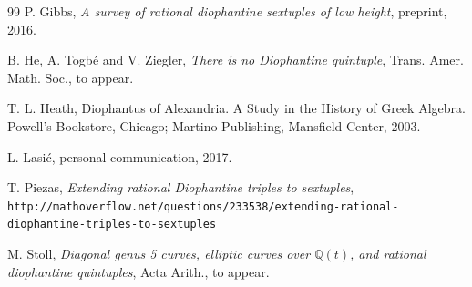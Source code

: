 \documentclass[a4paper]{amsart}
\theoremstyle{plain}
\theoremstyle{definition}
\begin{document}
\begin{thebibliography}{99}
P. Gibbs,
{\it A survey of rational diophantine sextuples of low height}, preprint, 2016.

B. He, A. Togb\'e and V. Ziegler,
{\it There is no Diophantine quintuple}, Trans. Amer. Math. Soc., to appear.

T. L. Heath, Diophantus of Alexandria. A Study in the History of Greek Algebra. Powell's Bookstore, Chicago; Martino Publishing, Mansfield Center, 2003.

L. Lasi\'c, personal communication, 2017.

T. Piezas,
{\it Extending rational Diophantine triples to sextuples}, \\
{\tt http://mathoverflow.net/questions/233538/extending-rational-diophantine-triples-to-sextuples}

M. Stoll, {\it Diagonal genus 5 curves, elliptic curves over $\mathbb{Q}(t)$, and rational diophantine quintuples}, Acta Arith., to appear.



\end{thebibliography}
\end{document}
